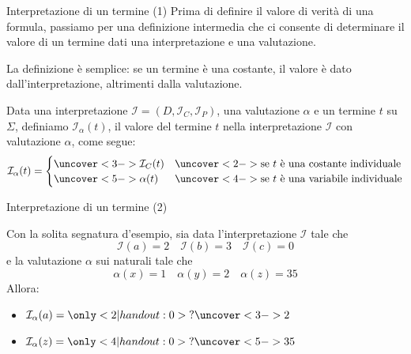 \documentclass[aspectratio=169,10pt,dvipsnames,xcolor=table,handout]{beamer}
\newcommand{\mcI}{\mathcal{I}}
\begin{document}
\begin{frame}{Interpretazione di un termine (1)}
    Prima di definire il valore di verità di una formula, passiamo per una definizione intermedia che ci consente di determinare il valore di un termine dati una interpretazione e una valutazione.

    \medskip
    La definizione è semplice: se un termine è una costante, il valore è dato dall'interpretazione, altrimenti dalla valutazione.

    \pause
    \begin{definition}
        Data una interpretazione $\mathcal I = (D, \mcI_C, \mcI_P)$, una valutazione $\alpha$ e un termine $t$ su $\Sigma$, definiamo $\mcI_\alpha(t)$, il \alert{valore del termine} $t$ nella interpretazione $\mcI$ con valutazione $\alpha$, come segue:
        \[
            \mcI_\alpha(t) = \begin{cases}
                \uncover<3->{\mcI_C(t)} & \uncover<2->{\text{se $t$ è una costante individuale}}  \\
                \uncover<5->{\alpha(t)} & \uncover<4->{\text{se $t$ è una variabile individuale}}
            \end{cases}
        \]
    \end{definition}
\end{frame}

\begin{frame}{Interpretazione di un termine (2)}
    \begin{example}
        Con la solita segnatura d'esempio, sia data l'interpretazione $\mcI$ tale che
        \[\mcI(a) = 2 \quad \mcI(b) = 3 \quad  \mcI(c)=0 \]
        e la valutazione $\alpha$ sui naturali tale che
        \[ \alpha(x) = 1 \quad \alpha(y) = 2 \quad \alpha(z) = 35\]
        Allora:
        \begin{itemize}
            \item $\mcI_\alpha(a) = {\only<2|handout:0>{?}\uncover<3->{2}}$
            \item $\mcI_\alpha(z) = {\only<4|handout:0>{?}\uncover<5->{35}}$
        \end{itemize}
    \end{example}
\end{frame}
\end{document}
